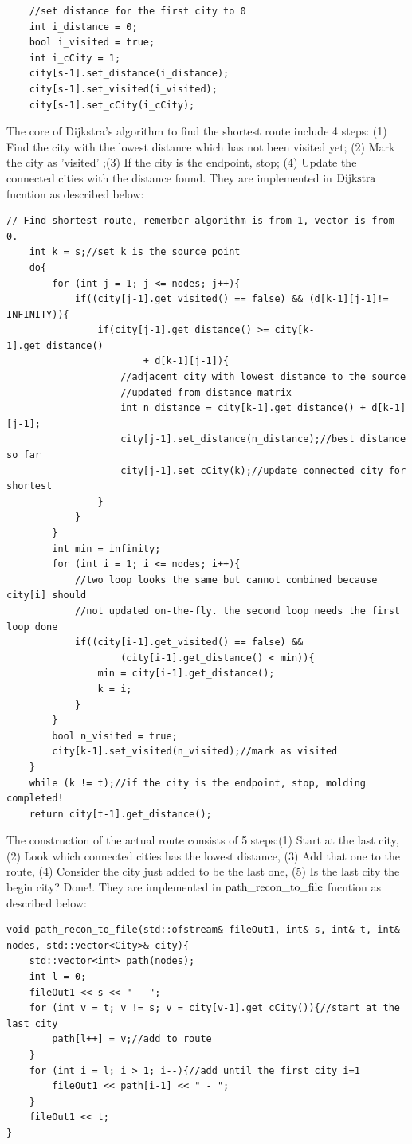 \documentclass[a4paper,12pt]{article}%
\begin{document}
\begin{lstlisting}
    //set distance for the first city to 0
    int i_distance = 0;
    bool i_visited = true;
    int i_cCity = 1;
    city[s-1].set_distance(i_distance);
    city[s-1].set_visited(i_visited);
    city[s-1].set_cCity(i_cCity);
\end{lstlisting}
The core of Dijkstra's algorithm to find the shortest route include 4 steps: (1) Find the city with the lowest distance which has not been visited yet; (2) Mark the city as 'visited' ;(3) If the city is the endpoint, stop; (4) Update the connected cities with the distance found. They are implemented in  $\lstinline{Dijkstra}$ fucntion as described below:
\begin{lstlisting}[title = $\lstinline{Dijkstra}$]
// Find shortest route, remember algorithm is from 1, vector is from 0.
    int k = s;//set k is the source point
    do{
        for (int j = 1; j <= nodes; j++){
            if((city[j-1].get_visited() == false) && (d[k-1][j-1]!= INFINITY)){
                if(city[j-1].get_distance() >= city[k-1].get_distance() 
                        + d[k-1][j-1]){
                    //adjacent city with lowest distance to the source
                    //updated from distance matrix
                    int n_distance = city[k-1].get_distance() + d[k-1][j-1];
                    city[j-1].set_distance(n_distance);//best distance so far
                    city[j-1].set_cCity(k);//update connected city for shortest
                }        
            }           
        }
        int min = infinity;
        for (int i = 1; i <= nodes; i++){           
            //two loop looks the same but cannot combined because city[i] should
            //not updated on-the-fly. the second loop needs the first loop done
            if((city[i-1].get_visited() == false) && 
                    (city[i-1].get_distance() < min)){
                min = city[i-1].get_distance();
                k = i;
            }
        }
        bool n_visited = true;
        city[k-1].set_visited(n_visited);//mark as visited
    }
    while (k != t);//if the city is the endpoint, stop, molding completed! 
    return city[t-1].get_distance();    
\end{lstlisting}
The construction of the actual route consists of 5 steps:(1) Start at the last city, (2) Look which connected cities has the lowest distance, (3) Add that one to the route, (4) Consider the city just added to be the last one, (5) Is the last city the begin city? Done!. They are implemented in  $\lstinline{path_recon_to_file}$ fucntion as described below:
\begin{lstlisting}[title = $\lstinline{path_recon_to_file}$]
void path_recon_to_file(std::ofstream& fileOut1, int& s, int& t, int& nodes, std::vector<City>& city){
    std::vector<int> path(nodes); 
    int l = 0;
    fileOut1 << s << " - ";
    for (int v = t; v != s; v = city[v-1].get_cCity()){//start at the last city
        path[l++] = v;//add to route
    }
    for (int i = l; i > 1; i--){//add until the first city i=1
        fileOut1 << path[i-1] << " - ";
    }       
    fileOut1 << t;
}
\end{lstlisting}
\end{document}
